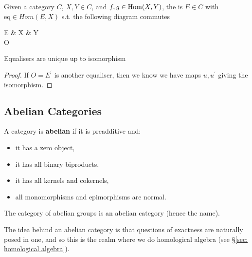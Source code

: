 \documentclass{article}
\begin{document}
\begin{definition}
	Given a category $C$, $X,Y \in C$, and $f,g \in \operatorname{Hom}(X,Y)$, the  is $E \in C$ with $\text{eq}\in Hom(E,X)$ s.t. the following diagram commutes
	\begin{tkz}
		E \arrow[r,"\text{eq}"] & X   & Y \\
		O  \arrow[ur,"m"']
	\end{tkz}
\end{definition}

\begin{prop}
	Equalisers are unique up to isomorphism
\end{prop}
\begin{proof}
	If $O=E^\prime$ is another equaliser, then we know we have maps $u,u^\prime$ giving the isomorphism. 
\end{proof}
\subsection{Abelian Categories}

\begin{definition}
	A category is \textbf{abelian} if it is preadditive and: 
	\begin{itemize}
		\item it has a zero object, 
		\item it has all binary biproducts,
		\item it has all kernels and cokernels,
		\item all monomorphisms and epimorphisms are normal. 
	\end{itemize}
\end{definition}

\begin{example}
	The category of abelian groups is an abelian category (hence the name). 
\end{example}

\begin{remark}
	The idea behind an abelian category is that questions of exactness are naturally posed in one, and so this is the realm where we do homological algebra (see \S \ref{sec: homological algebra}).
\end{remark}
\end{document}

